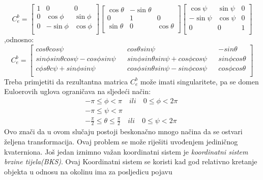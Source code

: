 \begin{equation}    
    C_e^b=\begin{bmatrix}
        1&0&0\\
        0&\cos\phi & \sin\phi \\
        0 & -\sin\phi & \cos\phi \\
    \end{bmatrix}    
    \begin{bmatrix}
        \cos\theta&-\sin\theta&\\
        0&1 & 0 \\
        \sin\theta & 0 & \cos\theta \\
    \end{bmatrix}
    \begin{bmatrix}
        \cos\psi & \sin\psi & 0\\
        -\sin\psi & \cos\psi &0\\
        0&0&1\\
    \end{bmatrix}
\end{equation}
,odnosno:
\begin{equation}
    C_e^b=\begin{bmatrix}
        cos\theta cos\psi && cos\theta sin\psi && -sin\theta\\
        sin\phi sin\theta cos\psi-cos\phi sin\psi && sin\phi sin\theta sin\psi +cos\phi cos\psi&& sin\phi cos\theta\\
        c\phi s\theta c\psi+sin\phi sin\psi && cos\phi sin\theta sin\psi -sin\phi cos\psi&& cos\phi cos\theta\\
    \end{bmatrix}
\end{equation}
Treba primjetiti da rezultantna matrica $C_e^b$ može imati singularitete, pa se domen
Euloerovih uglova ograničava na sljedeći način:
\begin{align*}
    -\pi \leq \phi <\pi \quad ili \quad 0\leq\phi<2\pi \\
    -\pi \leq \psi <\pi \qquad \qquad \qquad \qquad \\
    -\frac{\pi}{2}\leq \theta \leq \frac{\pi}{2} \quad ili \quad 0\leq\psi<2\pi
\end{align*}
Ovo znači da u ovom slučaju postoji beskonačno mnogo načina da se ostvari željena transformacija.
Ovaj problem se može riješiti uvođenjem jediničnog kvaterniona.
Još jedan iznimno važan koordinatni sistem je \textit{koordinatni sistem brzine tijela(BKS)}. Ovaj Koordinatni
sistem se koristi kad god relativno kretanje objekta u odnosu na okolinu ima za posljedicu pojavu 
